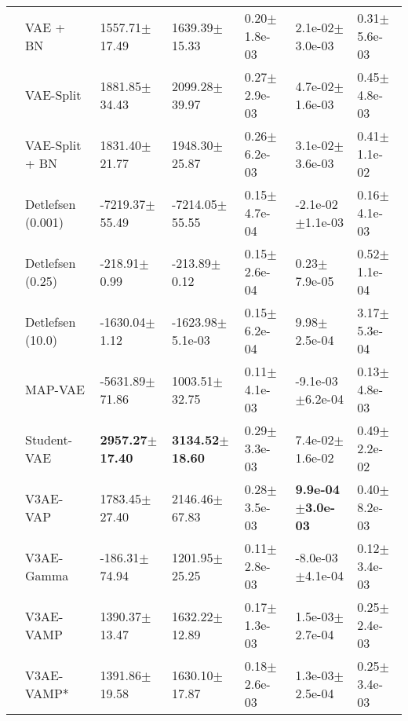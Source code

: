 \begin{tabular}{lllllll}
      & VAE + BN &            1557.71$\pm$17.49 &            1639.39$\pm$15.33 &              0.20$\pm$1.8e-03 &            2.1e-02$\pm$3.0e-03 &              0.31$\pm$5.6e-03 \\
      & VAE-Split &            1881.85$\pm$34.43 &            2099.28$\pm$39.97 &              0.27$\pm$2.9e-03 &            4.7e-02$\pm$1.6e-03 &              0.45$\pm$4.8e-03 \\
      & VAE-Split + BN &            1831.40$\pm$21.77 &            1948.30$\pm$25.87 &              0.26$\pm$6.2e-03 &            3.1e-02$\pm$3.6e-03 &              0.41$\pm$1.1e-02 \\
      & Detlefsen (0.001) &           -7219.37$\pm$55.49 &           -7214.05$\pm$55.55 &              0.15$\pm$4.7e-04 &           -2.1e-02$\pm$1.1e-03 &              0.16$\pm$4.1e-03 \\
      & Detlefsen (0.25) &             -218.91$\pm$0.99 &             -213.89$\pm$0.12 &              0.15$\pm$2.6e-04 &               0.23$\pm$7.9e-05 &              0.52$\pm$1.1e-04 \\
      & Detlefsen (10.0) &            -1630.04$\pm$1.12 &         -1623.98$\pm$5.1e-03 &              0.15$\pm$6.2e-04 &               9.98$\pm$2.5e-04 &              3.17$\pm$5.3e-04 \\
      & MAP-VAE &           -5631.89$\pm$71.86 &            1003.51$\pm$32.75 &              0.11$\pm$4.1e-03 &           -9.1e-03$\pm$6.2e-04 &              0.13$\pm$4.8e-03 \\
      & Student-VAE &   \textbf{2957.27$\pm$17.40} &   \textbf{3134.52$\pm$18.60} &              0.29$\pm$3.3e-03 &            7.4e-02$\pm$1.6e-02 &              0.49$\pm$2.2e-02 \\
      & V3AE-VAP &            1783.45$\pm$27.40 &            2146.46$\pm$67.83 &              0.28$\pm$3.5e-03 &   \textbf{9.9e-04$\pm$3.0e-03} &              0.40$\pm$8.2e-03 \\
      & V3AE-Gamma &            -186.31$\pm$74.94 &            1201.95$\pm$25.25 &              0.11$\pm$2.8e-03 &           -8.0e-03$\pm$4.1e-04 &              0.12$\pm$3.4e-03 \\
      & V3AE-VAMP &            1390.37$\pm$13.47 &            1632.22$\pm$12.89 &              0.17$\pm$1.3e-03 &            1.5e-03$\pm$2.7e-04 &              0.25$\pm$2.4e-03 \\
      & V3AE-VAMP* &            1391.86$\pm$19.58 &            1630.10$\pm$17.87 &              0.18$\pm$2.6e-03 &            1.3e-03$\pm$2.5e-04 &              0.25$\pm$3.4e-03 \\

\end{tabular}

